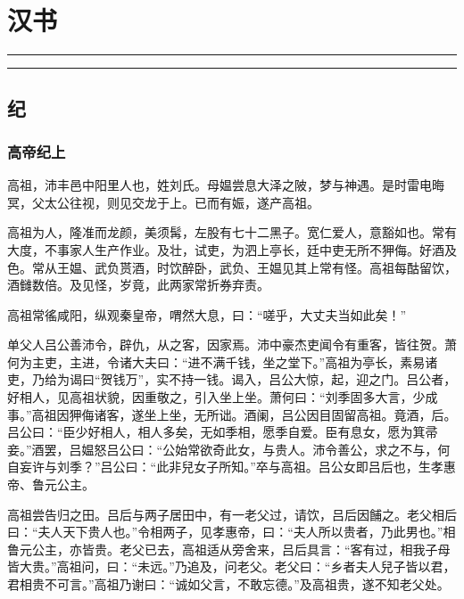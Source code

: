 \documentclass[]{article}
\date{}
\begin{document}
\hypertarget{header-n0}{%
\section{汉书}\label{header-n0}}

\begin{center}\rule{0.5\linewidth}{\linethickness}\end{center}

\tableofcontents

\begin{center}\rule{0.5\linewidth}{\linethickness}\end{center}

\hypertarget{header-n5}{%
\subsection{纪}\label{header-n5}}

\hypertarget{header-n6}{%
\subsubsection{高帝纪上}\label{header-n6}}

高祖，沛丰邑中阳里人也，姓刘氏。母媪尝息大泽之陂，梦与神遇。是时雷电晦冥，父太公往视，则见交龙于上。已而有娠，遂产高祖。

高祖为人，隆准而龙颜，美须髯，左股有七十二黑子。宽仁爱人，意豁如也。常有大度，不事家人生产作业。及壮，试吏，为泗上亭长，廷中吏无所不狎侮。好酒及色。常从王媪、武负贳酒，时饮醉卧，武负、王媪见其上常有怪。高祖每酤留饮，酒雠数倍。及见怪，岁竟，此两家常折券弃责。

高祖常徭咸阳，纵观秦皇帝，喟然大息，曰：``嗟乎，大丈夫当如此矣！''

单父人吕公善沛令，辟仇，从之客，因家焉。沛中豪杰吏闻令有重客，皆往贺。萧何为主吏，主进，令诸大夫曰：``进不满千钱，坐之堂下。''高祖为亭长，素易诸吏，乃给为谒曰``贺钱万''，实不持一钱。谒入，吕公大惊，起，迎之门。吕公者，好相人，见高祖状貌，因重敬之，引入坐上坐。萧何曰：``刘季固多大言，少成事。''高祖因狎侮诸客，遂坐上坐，无所诎。酒阑，吕公因目固留高祖。竟酒，后。吕公曰：``臣少好相人，相人多矣，无如季相，愿季自爱。臣有息女，愿为箕帚妾。''酒罢，吕媪怒吕公曰：``公始常欲奇此女，与贵人。沛令善公，求之不与，何自妄许与刘季？''吕公曰：``此非兒女子所知。''卒与高祖。吕公女即吕后也，生孝惠帝、鲁元公主。

高祖尝告归之田。吕后与两子居田中，有一老父过，请饮，吕后因餔之。老父相后曰：``夫人天下贵人也。''令相两子，见孝惠帝，曰：``夫人所以贵者，乃此男也。''相鲁元公主，亦皆贵。老父已去，高祖适从旁舍来，吕后具言：``客有过，相我子母皆大贵。''高祖问，曰：``未远。''乃追及，问老父。老父曰：``乡者夫人兒子皆以君，君相贵不可言。''高祖乃谢曰：``诚如父言，不敢忘德。''及高祖贵，遂不知老父处。
\end{document}
